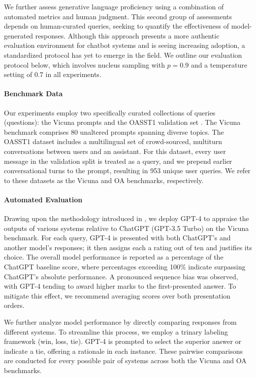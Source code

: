 We further assess generative language proficiency using a combination of automated metrics and human judgment. This second group of assessments depends on human-curated queries, seeking to quantify the effectiveness of model-generated responses. Although this approach presents a more authentic evaluation environment for chatbot systems and is seeing increasing adoption, a standardized protocol has yet to emerge in the field. We outline our evaluation protocol below, which involves nucleus sampling with $p=0.9$ and a temperature setting of $0.7$ in all experiments.

\paragraph{Benchmark Data} Our experiments employ two specifically curated collections of queries (questions): the Vicuna prompts \citep{vicuna2023} and the OASST1 validation set \citep{kopf2023openassistant}. The Vicuna benchmark comprises 80 unaltered prompts spanning diverse topics. The OASST1 dataset includes a multilingual set of crowd-sourced, multiturn conversations between users and an assistant. For this dataset, every user message in the validation split is treated as a query, and we prepend earlier conversational turns to the prompt, resulting in 953 unique user queries. We refer to these datasets as the Vicuna and OA benchmarks, respectively.

\paragraph{Automated Evaluation} Drawing upon the methodology introduced in \citet{vicuna2023}, we deploy GPT-4 to appraise the outputs of various systems relative to ChatGPT (GPT-3.5 Turbo) on the Vicuna benchmark. For each query, GPT-4 is presented with both ChatGPT's and another model's responses; it then assigns each a rating out of ten and justifies its choice. The overall model performance is reported as a percentage of the ChatGPT baseline score, where percentages exceeding 100\% indicate surpassing ChatGPT's absolute performance. A pronounced sequence bias was observed, with GPT-4 tending to award higher marks to the first-presented answer. To mitigate this effect, we recommend averaging scores over both presentation orders.

We further analyze model performance by directly comparing responses from different systems. To streamline this process, we employ a trinary labeling framework (win, loss, tie). GPT-4 is prompted to select the superior answer or indicate a tie, offering a rationale in each instance. These pairwise comparisons are conducted for every possible pair of systems across both the Vicuna and OA benchmarks.

